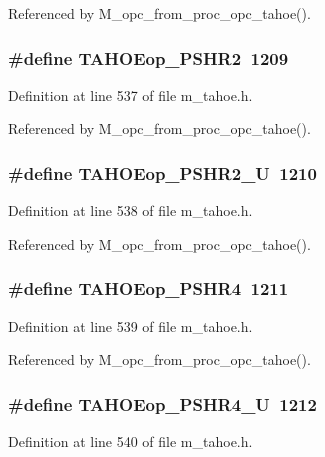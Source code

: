 Referenced by M\_\-opc\_\-from\_\-proc\_\-opc\_\-tahoe().
\subsubsection{\setlength{\rightskip}{0pt plus 5cm}\#define TAHOEop\_\-PSHR2~1209}\label{m__tahoe_8h_a982b0d29a7949789adbc67558a19bb1}




Definition at line 537 of file m\_\-tahoe.h.

Referenced by M\_\-opc\_\-from\_\-proc\_\-opc\_\-tahoe().
\subsubsection{\setlength{\rightskip}{0pt plus 5cm}\#define TAHOEop\_\-PSHR2\_\-U~1210}\label{m__tahoe_8h_5de8ff5ec0ce24ca65be605c077b55ce}




Definition at line 538 of file m\_\-tahoe.h.

Referenced by M\_\-opc\_\-from\_\-proc\_\-opc\_\-tahoe().
\subsubsection{\setlength{\rightskip}{0pt plus 5cm}\#define TAHOEop\_\-PSHR4~1211}\label{m__tahoe_8h_b84f41fcb16f6090aa8bd13f2521cb43}




Definition at line 539 of file m\_\-tahoe.h.

Referenced by M\_\-opc\_\-from\_\-proc\_\-opc\_\-tahoe().
\subsubsection{\setlength{\rightskip}{0pt plus 5cm}\#define TAHOEop\_\-PSHR4\_\-U~1212}\label{m__tahoe_8h_b5836861b97a0a2fc6f6d7d9828b711a}




Definition at line 540 of file m\_\-tahoe.h.

